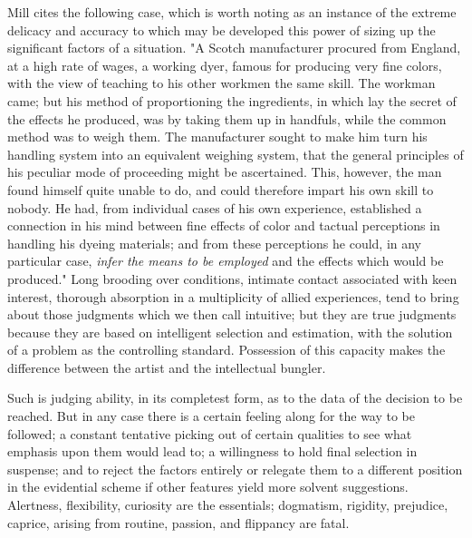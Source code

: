\documentclass[showtrims,ustradepaper]{memoir}
\begin{document}

Mill cites the following case, which is worth noting as an instance of
the extreme delicacy and accuracy to which may be developed this power
of sizing up the significant factors of a situation. "A Scotch
manufacturer procured from England, at a high rate of wages, a working
dyer, famous for producing very fine colors, with the view of teaching
to his other workmen the
same
skill. The workman came; but his method of proportioning the
ingredients, in which lay the secret of the effects he produced, was by
taking them up in handfuls, while the common method was to weigh them.
The manufacturer sought to make him turn his handling system into an
equivalent weighing system, that the general principles of his peculiar
mode of proceeding might be ascertained. This, however, the man found
himself quite unable to do, and could therefore impart his own skill to
nobody. He had, from individual cases of his own experience, established
a connection in his mind between fine effects of color and tactual
perceptions in handling his dyeing materials; and from these perceptions
he could, in any particular case, \emph{infer the means to be employed}
and the effects which would be produced." Long brooding over conditions,
intimate contact associated with keen interest, thorough absorption in a
multiplicity of allied experiences, tend to bring about those judgments
which we then call intuitive; but they are true judgments because they
are based on intelligent selection and estimation, with the solution of
a problem as the controlling standard. Possession of this capacity makes
the difference between the artist and the intellectual bungler.

Such is judging ability, in its completest form, as to the data of the
decision to be reached. But in any case there is a certain feeling along
for the way to be followed; a constant tentative picking out of certain
qualities to see what emphasis upon them would lead to; a willingness to
hold final selection in suspense; and to reject the factors entirely or
relegate them to a different position in the evidential scheme if other
features yield more solvent suggestions. Alertness, flexibility,
curiosity
are the essentials; dogmatism, rigidity, prejudice, caprice, arising
from routine, passion, and flippancy are fatal.

\end{document}
